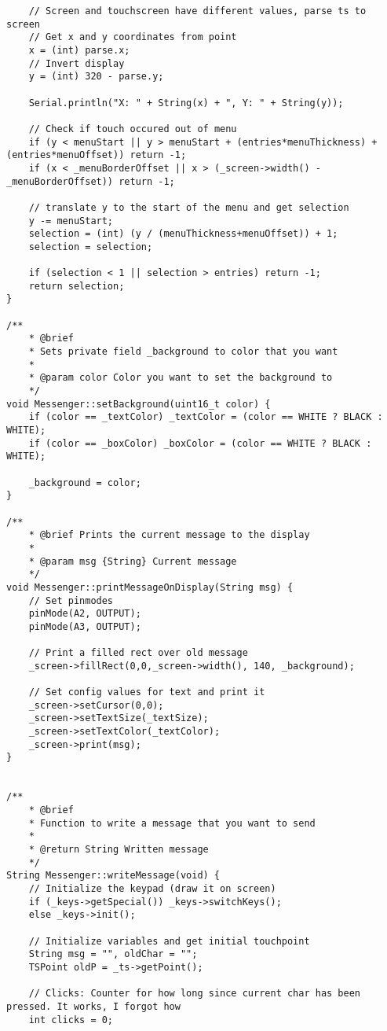 \documentclass[a4paper, 11pt]{scrartcl}
\begin{document}
\begin{lstlisting}
    // Screen and touchscreen have different values, parse ts to screen
    // Get x and y coordinates from point
    x = (int) parse.x;
    // Invert display
    y = (int) 320 - parse.y;

    Serial.println("X: " + String(x) + ", Y: " + String(y));

    // Check if touch occured out of menu
    if (y < menuStart || y > menuStart + (entries*menuThickness) + (entries*menuOffset)) return -1;
    if (x < _menuBorderOffset || x > (_screen->width() - _menuBorderOffset)) return -1;

    // translate y to the start of the menu and get selection
    y -= menuStart;
    selection = (int) (y / (menuThickness+menuOffset)) + 1;
    selection = selection;

    if (selection < 1 || selection > entries) return -1;
    return selection;
}

/**
    * @brief 
    * Sets private field _background to color that you want
    * 
    * @param color Color you want to set the background to
    */
void Messenger::setBackground(uint16_t color) {
    if (color == _textColor) _textColor = (color == WHITE ? BLACK : WHITE);
    if (color == _boxColor) _boxColor = (color == WHITE ? BLACK : WHITE);

    _background = color;
}

/**
    * @brief Prints the current message to the display
    * 
    * @param msg {String} Current message 
    */
void Messenger::printMessageOnDisplay(String msg) {
    // Set pinmodes
    pinMode(A2, OUTPUT);
    pinMode(A3, OUTPUT);

    // Print a filled rect over old message
    _screen->fillRect(0,0,_screen->width(), 140, _background);
    
    // Set config values for text and print it
    _screen->setCursor(0,0);
    _screen->setTextSize(_textSize);
    _screen->setTextColor(_textColor);
    _screen->print(msg);
}


/**
    * @brief 
    * Function to write a message that you want to send
    * 
    * @return String Written message
    */
String Messenger::writeMessage(void) {
    // Initialize the keypad (draw it on screen)
    if (_keys->getSpecial()) _keys->switchKeys();
    else _keys->init();

    // Initialize variables and get initial touchpoint
    String msg = "", oldChar = "";
    TSPoint oldP = _ts->getPoint();
    
    // Clicks: Counter for how long since current char has been pressed. It works, I forgot how
    int clicks = 0;


\end{lstlisting}
\end{document}
